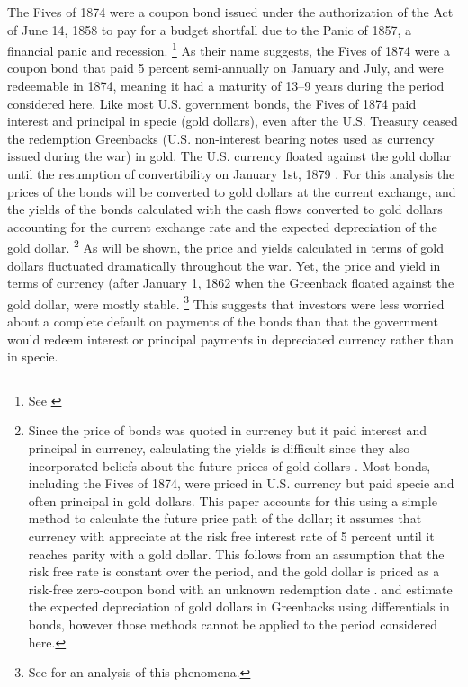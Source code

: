 The Fives of 1874 were a coupon bond issued under the authorization of the Act of June 14, 1858 to pay for a budget shortfall due to the Panic of 1857, a financial panic and recession.%
\footnote{
  See \textcites[p. 76]{Bayley1882}[78--79]{DeKnight1900}[42-43]{Treasury1863}[300-301, 305]{HomerSylla2005}
}
As their name suggests, the Fives of 1874 were a coupon bond that paid 5 percent semi-annually on January and July, and were redeemable in 1874, meaning it had a maturity of 13--9 years during the period considered here.
Like most U.S. government bonds, the Fives of 1874 paid interest and principal in specie (gold dollars), even after the U.S. Treasury ceased the redemption Greenbacks (U.S. non-interest bearing notes used as currency issued during the war) in gold.
The U.S. currency floated against the gold dollar until the resumption of convertibility on January 1st, 1879 \parencites{Dewey1918}{WillardGuinnaneEtAl1996}.
For this analysis the prices of the bonds will be converted to gold dollars at the current exchange, and the yields of the bonds calculated with the cash flows converted to gold dollars accounting for the current exchange rate and the expected depreciation of the gold dollar.%
\footnote{
  Since the price of bonds was quoted in currency but it paid interest and principal in currency, calculating the yields is difficult since they also incorporated beliefs about the future prices of gold dollars \parencites[Appendix A]{Macaulay1938}{Roll1972}{Calomiris1988}[302-303]{HomerSylla2005}.
  Most bonds, including the Fives of 1874, were priced in U.S. currency but paid specie and often principal in gold dollars.
  This paper accounts for this using a simple method to calculate the future price path of the dollar; it assumes that currency with appreciate at the risk free interest rate of 5 percent until it reaches parity with a gold dollar.
  This follows from an assumption that the risk free rate is constant over the period, and the gold dollar is priced as a risk-free zero-coupon bond with an unknown redemption date \cite{McCandless1996}.
  \textcite{Roll1972} and \textcite{Calomiris1988} estimate the expected depreciation of gold dollars in Greenbacks using differentials in bonds, however those methods cannot be applied to the period considered here.
}
As will be shown, the price and yields calculated in terms of gold dollars fluctuated dramatically throughout the war.
Yet, the price and yield in terms of currency (after January 1, 1862 when the Greenback floated against the gold dollar, were mostly stable.%
\footnote{See \textcite{Roll1972} for an analysis of this phenomena.}
This suggests that investors were less worried about a complete default on payments of the bonds than that the government would redeem interest or principal payments in depreciated currency rather than in specie.

